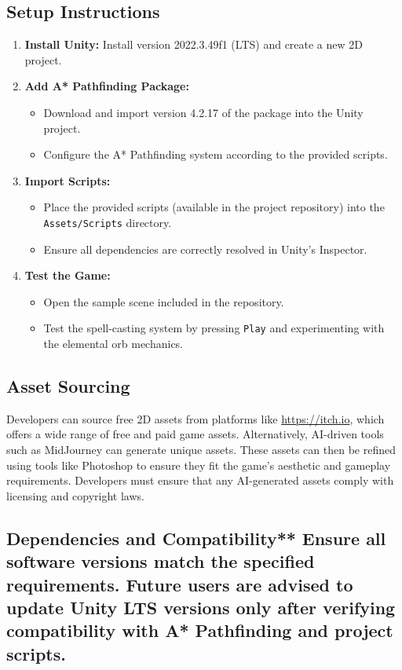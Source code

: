 \documentclass[10pt,twocolumn]{article}
\begin{document}
\subsection{Setup Instructions}
\begin{enumerate}
    \item \textbf{Install Unity:} Install version 2022.3.49f1 (LTS) and create a new 2D project.
    \item \textbf{Add A* Pathfinding Package:}
    \begin{itemize}
        \item Download and import version 4.2.17 of the package into the Unity project.
        \item Configure the A* Pathfinding system according to the provided scripts.
    \end{itemize}
    \item \textbf{Import Scripts:}
    \begin{itemize}
        \item Place the provided scripts (available in the project repository) into the \texttt{Assets/Scripts} directory.
        \item Ensure all dependencies are correctly resolved in Unity’s Inspector.
    \end{itemize}
    \item \textbf{Test the Game:}
    \begin{itemize}
        \item Open the sample scene included in the repository.
        \item Test the spell-casting system by pressing \texttt{Play} and experimenting with the elemental orb mechanics.
    \end{itemize}
\end{enumerate}

\subsection{Asset Sourcing} Developers can source free 2D assets from platforms like \url{https://itch.io}, which offers a wide range of free and paid game assets. Alternatively, AI-driven tools such as MidJourney can generate unique assets. These assets can then be refined using tools like Photoshop to ensure they fit the game’s aesthetic and gameplay requirements. Developers must ensure that any AI-generated assets comply with licensing and copyright laws.

\subsection{Dependencies and Compatibility** Ensure all software versions match the specified requirements. Future users are advised to update Unity LTS versions only after verifying compatibility with A* Pathfinding and project scripts.}\
\end{document}
